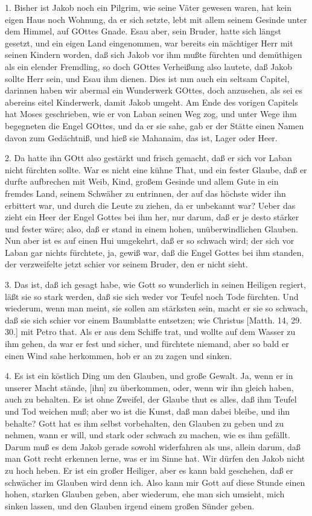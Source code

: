1. Bisher ist Jakob noch ein Pilgrim, wie seine Väter gewesen waren, hat kein eigen Haus noch Wohnung, da er sich setzte, lebt mit allem seinem Gesinde unter dem Himmel, auf GOttes Gnade. Esau aber, sein Bruder, hatte sich längst gesetzt, und ein eigen Land eingenommen, war bereits ein mächtiger Herr mit seinen Kindern worden, daß sich Jakob vor ihm mußte fürchten und demüthigen als ein elender Fremdling, so doch GOttes Verheißung also lautete, daß Jakob sollte Herr sein, und Esau ihm dienen. Dies ist nun auch ein seltsam Capitel, darinnen haben wir abermal ein Wunderwerk GOttes, doch anzusehen, als sei es abereins eitel Kinderwerk, damit Jakob umgeht. Am Ende des vorigen Capitels hat Moses geschrieben, wie er von Laban seinen Weg zog, und unter Wege ihm begegneten die Engel GOttes, und da er sie sahe, gab er der Stätte einen Namen davon zum Gedächtniß, und hieß sie Mahanaim, das ist, Lager oder Heer.

2. Da hatte ihn GOtt also gestärkt und frisch gemacht, daß er sich vor Laban nicht fürchten sollte. War es nicht eine kühne That, und ein fester Glaube, daß er durfte aufbrechen mit Weib, Kind, großem Gesinde und allem Gute in ein fremdes Land, seinem Schwäher zu entrinnen, der auf das höchste wider ihn erbittert war, und durch die Leute zu ziehen, da er unbekannt
war? Ueber das zieht ein Heer der Engel Gottes bei ihm her, nur darum, daß er je desto stärker und fester wäre; also, daß er stand in einem hohen, unüberwindlichen Glauben. Nun aber ist es auf einen Hui umgekehrt, daß er so schwach wird; der sich vor Laban gar nichts fürchtete, ja, gewiß war, daß die Engel Gottes bei ihm standen, der verzweifelte jetzt schier vor seinem Bruder, den er nicht sieht.

3. Das ist, daß ich gesagt habe, wie Gott so wunderlich in seinen Heiligen regiert, läßt sie so stark werden, daß sie sich weder vor Teufel noch Tode fürchten. Und wiederum, wenn man meint, sie sollen am stärksten sein, macht er sie so schwach, daß sie sich schier vor einem Baumblatte entsetzen; wie Christus [Matth. 14, 29. 30.] mit Petro that. Als er aus dem Schiffe trat, und wollte auf dem Wasser zu ihm gehen, da war er fest und sicher, und fürchtete niemand, aber so bald er einen Wind sahe herkommen, hob er an zu zagen und sinken.

4. Es ist ein köstlich Ding um den Glauben, und große Gewalt. Ja, wenn er in unserer Macht stände, [ihn] zu überkommen, oder, wenn wir ihn gleich haben, auch zu behalten. Es ist ohne Zweifel, der Glaube thut es alles, daß ihm Teufel und Tod weichen muß; aber wo ist die Kunst, daß man dabei bleibe, und ihn behalte? Gott hat es ihm selbst vorbehalten, den Glauben zu geben und zu nehmen, wann er will, und stark oder schwach zu machen, wie es ihm gefällt. Darum muß es dem Jakob gerade sowohl widerfahren als uns, allein darum, daß man Gott recht erkennen lerne, was er im Sinne hat. Wir dürfen den Jakob nicht zu hoch heben. Er ist ein großer Heiliger, aber es kann bald geschehen, daß er schwächer im Glauben wird denn ich. Also kann mir Gott auf diese Stunde einen hohen, starken Glauben geben, aber wiederum, ehe man sich umsieht, mich sinken lassen, und den Glauben irgend einem großen Sünder geben.

